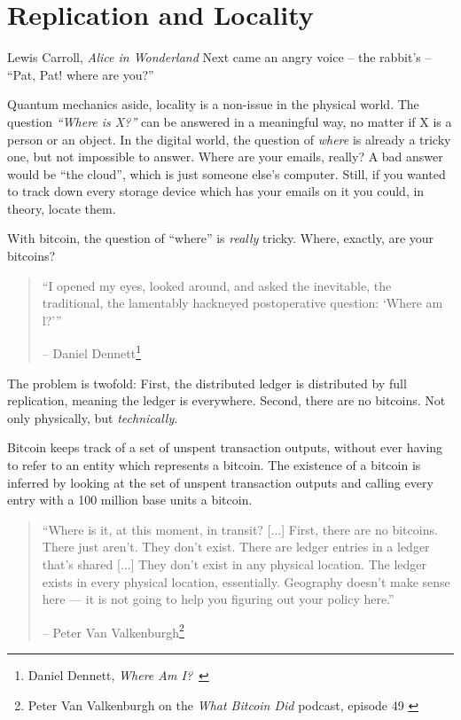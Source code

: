 \chapter{Replication and Locality}
\label{les:3}

\begin{chapquote}{Lewis Carroll, \textit{Alice in Wonderland}}
Next came an angry voice -- the rabbit's -- \enquote{Pat, Pat! where are you?}
\end{chapquote}

Quantum mechanics aside, locality is a non-issue in the physical world.
The question \textit{\enquote{Where is X?}} can be answered in a meaningful way, no
matter if X is a person or an object. In the digital world, the question
of \textit{where} is already a tricky one, but not impossible to answer. Where
are your emails, really? A bad answer would be \enquote{the cloud}, which is
just someone else's computer. Still, if you wanted to track down every
storage device which has your emails on it you could, in theory, locate
them.

With bitcoin, the question of \enquote{where} is \textit{really} tricky. Where,
exactly, are your bitcoins?

\begin{quotation}\begin{samepage}
\enquote{I opened my eyes, looked around, and asked the inevitable, the
traditional, the lamentably hackneyed postoperative question: `Where
am l?'}
\begin{flushright} -- Daniel Dennett\footnote{Daniel Dennett, \textit{Where Am I?}~\cite{where-am-i}}
\end{flushright}\end{samepage}\end{quotation}

The problem is twofold: First, the distributed ledger is distributed by
full replication, meaning the ledger is everywhere. Second, there are no
bitcoins. Not only physically, but \textit{technically}.

Bitcoin keeps track of a set of unspent transaction outputs, without
ever having to refer to an entity which represents a bitcoin. The
existence of a bitcoin is inferred by looking at the set of unspent
transaction outputs and calling every entry with a 100 million base
units a bitcoin.

\begin{quotation}\begin{samepage}
\enquote{Where is it, at this moment, in transit? [...] First, there are no
bitcoins. There just aren't. They don't exist. There are ledger
entries in a ledger that's shared [...] They don't exist in any
physical location. The ledger exists in every physical location,
essentially. Geography doesn't make sense here --- it is not going to
help you figuring out your policy here.}
\begin{flushright} -- Peter Van Valkenburgh\footnote{Peter Van Valkenburgh on the \textit{What Bitcoin Did} podcast, episode 49 \cite{wbd049}}
\end{flushright}\end{samepage}\end{quotation}

